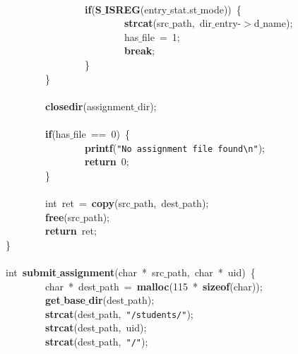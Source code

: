 \mbox{}\ \ \ \ \ \ \ \ \ \ \ \ \ \ \ \  \\
\mbox{}\ \ \ \ \ \ \ \ \ \ \ \ \ \ \ \ \textbf{if}(\textbf{S$\_$ISREG}(entry$\_$stat.st$\_$mode))\ \{ \\
\mbox{}\ \ \ \ \ \ \ \ \ \ \ \ \ \ \ \ \ \ \ \ \ \ \ \ \textbf{strcat}(src$\_$path,\ dir$\_$entry-$>$d$\_$name); \\
\mbox{}\ \ \ \ \ \ \ \ \ \ \ \ \ \ \ \ \ \ \ \ \ \ \ \ has$\_$file\ =\ 1; \\
\mbox{}\ \ \ \ \ \ \ \ \ \ \ \ \ \ \ \ \ \ \ \ \ \ \ \ \textbf{break}; \\
\mbox{}\ \ \ \ \ \ \ \ \ \ \ \ \ \ \ \ \} \\
\mbox{}\ \ \ \ \ \ \ \ \} \\
\mbox{} \\
\mbox{}\ \ \ \ \ \ \ \ \textbf{closedir}(assignment$\_$dir); \\
\mbox{} \\
\mbox{}\ \ \ \ \ \ \ \ \textbf{if}(has$\_$file\ ==\ 0)\ \{ \\
\mbox{}\ \ \ \ \ \ \ \ \ \ \ \ \ \ \ \ \textbf{printf}(\texttt{"{}No\ assignment\ file\ found}\texttt{\textbackslash{}n}\texttt{"{}}); \\
\mbox{}\ \ \ \ \ \ \ \ \ \ \ \ \ \ \ \ \textbf{return}\ 0; \\
\mbox{}\ \ \ \ \ \ \ \ \} \\
\mbox{}\ \ \ \ \ \ \ \  \\
\mbox{}\ \ \ \ \ \ \ \ int\ ret\ =\ \textbf{copy}(src$\_$path,\ dest$\_$path); \\
\mbox{}\ \ \ \ \ \ \ \ \textbf{free}(src$\_$path); \\
\mbox{}\ \ \ \ \ \ \ \ \textbf{return}\ ret; \\
\mbox{}\} \\
\mbox{} \\
\mbox{}int\ \textbf{submit$\_$assignment}(char\ *\ src$\_$path,\ char\ *\ uid)\ \{ \\
\mbox{}\ \ \ \ \ \ \ \ char\ *\ dest$\_$path\ =\ \textbf{malloc}(115\ *\ \textbf{sizeof}(char)); \\
\mbox{}\ \ \ \ \ \ \ \ \textbf{get$\_$base$\_$dir}(dest$\_$path); \\
\mbox{}\ \ \ \ \ \ \ \ \textbf{strcat}(dest$\_$path,\ \texttt{"{}/students/"{}}); \\
\mbox{}\ \ \ \ \ \ \ \ \textbf{strcat}(dest$\_$path,\ uid); \\
\mbox{}\ \ \ \ \ \ \ \ \textbf{strcat}(dest$\_$path,\ \texttt{"{}/"{}}); \\
